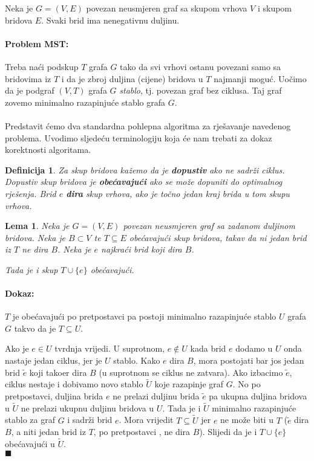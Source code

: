 \documentclass[a4paper,12pt]{article}
\newtheorem{df}{Definicija}
\newtheorem{lm}{Lema}
\begin{document}
Neka je $G=(V,E)$ povezan neusmjeren graf sa skupom vrhova  $V$ i skupom bridova $E$. Svaki brid ima nenegativnu duljinu.

\paragraph{Problem MST:}
Treba na\'ci podskup  $T$ grafa $G$ tako da svi vrhovi ostanu povezani samo sa bridovima iz $T$ i da je zbroj duljina (cijene) bridova u $T$ najmanji mogu\'c.
Uo\v{c}imo da je podgraf $(V,T)$ grafa $G$ \emph{stablo}, tj. povezan graf bez ciklusa. Taj graf zovemo minimalno razapinju\'ce stablo grafa $G$.

\paragraph{}
Predstavit \'cemo dva standardna pohlepna algoritma za rje\v{s}avanje navedenog problema. Uvodimo sljede\'cu terminologiju koja \'ce nam trebati za dokaz korektnosti algoritama.

\begin{df}
Za skup bridova ka\v{z}emo da je \textbf{dopustiv} ako ne sadr\v{z}i ciklus. Dopustiv skup bridova je \textbf{obe\'cavaju\'ci} ako se mo\v{z}e dopuniti do optimalnog rje\v{s}enja. 
Brid $e$ \textbf{dira} skup vrhova, ako je to\v{c}no jedan kraj brida u tom skupu vrhova.
\end{df}

\begin{lm}
Neka je $G=(V,E)$ povezan neusmjeren graf sa zadanom duljinom bridova. Neka je $B \subset V$ te $T \subseteq E$ obe\'cavaju\'ci skup bridova, takav da ni jedan brid iz $T$ ne dira $B$. Neka je $e$ najkra\'ci brid koji dira $B$.

Tada je i skup $ T \cup \{e\}$ obe\'cavaju\'ci.
\end{lm}

\paragraph{Dokaz:}
$T$ je obe\'cavaju\'ci po pretpostavci pa postoji minimalno razapinju\'ce stablo $U$ grafa $G$ takvo da je $T \subseteq U$.

Ako je $e \in U$ tvrdnja vrijedi.
U suprotnom, $e \notin U$ kada brid $e$ dodamo u $U$ onda nastaje jedan ciklus, jer je $U$ stablo.
Kako $e$ dira $B$, mora postojati bar jo\@{s} jedan brid $\tilde{e} $ koji tako\dj{}er dira $B$ (u suprotnom se ciklus ne zatvara). Ako izbacimo $\tilde{e} $, ciklus nestaje i dobivamo novo stablo $\tilde{U} $ koje razapinje graf $G$.
No po pretpostavci, duljina brida $e$ ne prelazi duljinu brida $\tilde{e} $ pa ukupna duljina bridova u $\tilde{U} $ ne prelazi ukupnu duljinu bridova u $U$. Tada je i $\tilde{U} $ minimalno razapinju\'ce stablo za graf $G$ i sadr\v{z}i brid $e$.
Mora vrijedit $T \subseteq \tilde{U} $ jer $e$ ne mo\v{z}e biti u $T$ ($\tilde{e}$ dira $B$, a niti jedan brid iz $T$, po pretpostavci , ne dira $B$).
Slijedi da je i $ T \cup \{ e \}$ obe\'cavaju\'ci u $\tilde{U} $.\\
$\blacksquare$ 
\end{document}
